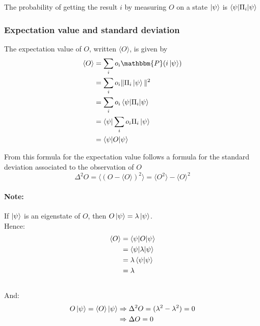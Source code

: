 \documentclass{article}
\begin{document}
The probability of getting the result $i$ by measuring $O$ on a state $\ket{\psi}$ is
$\braket{\psi|\Pi_i|\psi}$
\subsubsection*{Expectation value and standard deviation}

The expectation value of $O$, written $\langle O\rangle$, is given by
\begin{equation}
    \begin{aligned}
        \langle O\rangle
            & = \sum_i o_i \mathbbm{P}(i\ket{\psi}) \\
            & = \sum_i o_i \|\Pi_i\ket{\psi}\|^2 \\
            & = \sum_i o_i \braket{\psi|\Pi_i|\psi} \\
            & = \bra{\psi}\sum_i o_i \Pi_i \ket{\psi} \\
            & = \braket{\psi | O |\psi}
    \end{aligned}
\end{equation}

From this formula for the expectation value follows a formula for the standard deviation
associated to the observation of $O$
\begin{equation}
    \Delta^2 O = \langle(O - \langle O \rangle)^2\rangle = \langle O^2 \rangle - \langle O \rangle^2
\end{equation}

\paragraph{Note:} If $\ket{\psi}$ is an eigenstate of $O$, then $O\ket{\psi} = \lambda \ket{\psi}$.
\\
Hence:
\begin{equation}
    \begin{aligned}
        \braket{O}
            & = \braket{\psi | O | \psi} \\
            & = \braket{\psi | \lambda | \psi} \\
            & = \lambda\braket{\psi|\psi } \\
            & = \lambda
    \end{aligned}
\end{equation}
\\
And:
\begin{equation}
    \begin{aligned}
        O\ket{\psi} = \braket{O} \ket{\psi}
            & \Rightarrow \Delta^2 O = (\lambda^2 - \lambda^2) = 0 \\
            & \Rightarrow \Delta O = 0
    \end{aligned}
\end{equation}
\end{document}
